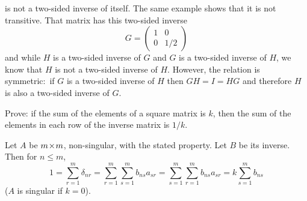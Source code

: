 \begin{exercises}
\begin{answer}
     is not a two-sided inverse of itself.
     The same example shows that it is not transitive.
     That matrix has this two-sided inverse
     \begin{equation*}
       G=\begin{pmatrix}
         1  &0  \\
         0  &1/2
       \end{pmatrix}
     \end{equation*}
     and while \( H \) is a two-sided inverse of \( G \) and \( G \)
     is a two-sided inverse of \( H \), we know that \( H \) is not a two-sided
     inverse of \( H \).
     However, the relation is symmetric:~if \( G \) is a two-sided inverse of 
     \( H \) then
     \( GH=I=HG \) and therefore \( H \) is also a two-sided
     inverse of \( G \).  
   \end{answer}
  \item  
    Prove: if the sum of the elements of a square
    matrix is \( k \), then the sum of the elements in each row of the
    inverse matrix is \( 1/k \).
    \cite{Monthly51p614}
    \begin{answer}
      \answerasgiven %
      Let \( A \) be \( m \! \times \! m \), non-singular, with the stated property.
      Let \( B \) be its inverse.
      Then for \( n\leq m \),
      \begin{equation*}
        1
        =\sum_{r=1}^{m}\delta_{nr}
        =\sum_{r=1}^{m}\sum_{s=1}^{m}b_{ns}a_{sr}
        =\sum_{s=1}^{m}\sum_{r=1}^{m}b_{ns}a_{sr}
        =k\sum_{s=1}^{m}b_{ns}
      \end{equation*}
      (\( A \) is singular if \( k=0 \)).  
   \end{answer}
\end{exercises}







